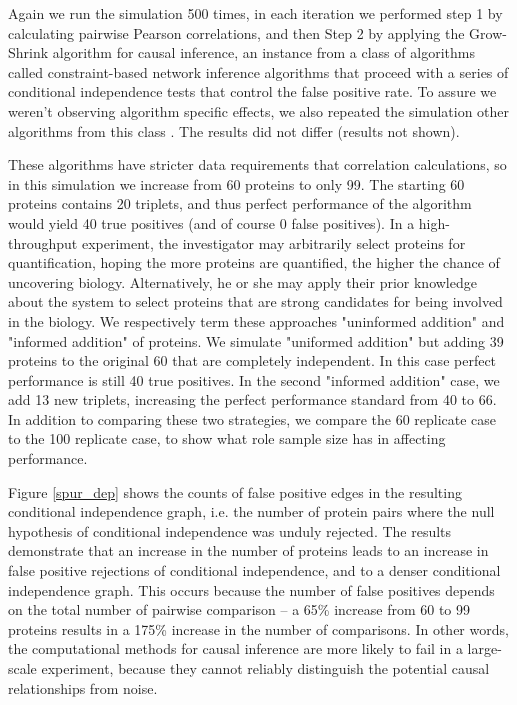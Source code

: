 \documentclass[journal=jacsat,manuscript=article]{achemso}
\def\added#1{{\color{blue} #1}}
\begin{document}
\added{Again we run the simulation 500 times, in each iteration we performed step 1 by calculating pairwise Pearson correlations, and then Step 2 by applying the Grow-Shrink algorithm \cite{margaritis2003learning} for causal inference, an instance from a class of algorithms called constraint-based network inference algorithms\cite{spirtes2000causation} that proceed with a series of conditional independence tests that control the false positive rate.  To assure we weren't observing algorithm specific effects, we also repeated the simulation other algorithms from this class\cite{tsamardinos2003algorithms}\cite{yaramakala2005speculative} .  The results did not differ (results not shown).}  

\added{These algorithms have stricter data requirements that correlation calculations, so in this simulation we increase from 60 proteins to only 99.  The starting 60 proteins contains 20 triplets, and thus perfect performance of the algorithm would yield 40 true positives (and of course 0 false positives).  In a high-throughput experiment, the investigator may arbitrarily select proteins for quantification, hoping the more proteins are quantified, the higher the chance of uncovering biology.  Alternatively, he or she may apply their prior knowledge about the system to select proteins that are strong candidates for being involved in the biology.  We respectively term these approaches "uninformed addition" and "informed addition" of proteins.  We simulate "uniformed addition" but adding 39 proteins to the original 60 that are completely independent.  In this case perfect performance is still 40 true positives.  In the second "informed addition" case, we add 13 new triplets, increasing the perfect performance standard from 40 to 66.  In addition to comparing these two strategies, we compare the 60 replicate case to the 100 replicate case, to show what role sample size has in affecting performance.}

Figure \ref{spur_dep} shows the counts of false positive edges in the resulting conditional independence graph, i.e. the number of protein pairs \added{where the null hypothesis of conditional independence was unduly rejected}.  The results demonstrate that an increase in the number of proteins leads to an increase in false positive rejections of conditional independence, and to a denser conditional independence graph.  \added{This occurs because the number of false positives depends on the total number of pairwise comparison -- a 65\% increase from 60 to 99 proteins results in a 175\% increase in the number of comparisons.  In other words, the computational methods for causal inference are more likely to fail in a large-scale experiment, because they cannot reliably distinguish the potential causal relationships from noise.}
\end{document}
